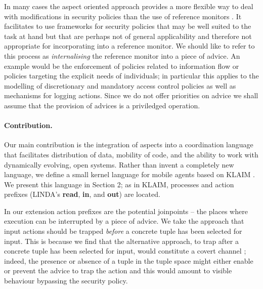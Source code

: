 \documentclass[a4paper]{llncs}
\begin{document}
In many cases the aspect oriented approach provides a more flexible
way to deal with modifications in security policies
\cite{Daniel07,gao2004aao,georg2002uad,verhanneman2005ual,dewin2004dsa}
than the use of reference monitors 
\cite{REF-Shneider}. 
It facilitates to use frameworks for security policies that may be well
suited to the task at hand but that are perhaps not of general
applicability and therefore not appropriate for incorporating into a reference monitor.  We should like to refer to
this process as \emph{internalising} the reference monitor into a
piece of advice. An example would be the enforcement of policies
related to information flow or policies targeting the explicit needs
of individuals; in particular this applies to the modelling of
discretionary and mandatory access control policies \cite{Gollmann} as
well as mechanisms for logging actions. Since we do not offer priorities on advice we shall assume that the provision of advices is a priviledged operation. 


\paragraph{Contribution.}

Our main contribution is the integration of aspects into a
coordination language that facilitates distribution of data, mobility
of code, and the ability to work with dynamically evolving, open
systems.  Rather than invent a completely new language, we define a
small kernel language for mobile agents based on KLAIM
\cite{bettini2003kpt,De1998,NicolaFP00}.  We present this language in
Section 2; as in KLAIM, processes and action prefixes (LINDA's
\textbf{read}, \textbf{in}, and \textbf{out}) are located.

In our extension action prefixes are the potential joinpoints -- the
places where execution can be interrupted by a piece of advice. We
take the approach that input actions should be trapped \emph{before} a
concrete tuple has been selected for input. This is because we find
that the alternative approach, to trap after a concrete tuple has been
selected for input, would constitute a covert channel
\cite{gligor1994guc,Gollmann}; indeed, the presence or absence of a
tuple in the tuple space might either enable or prevent the advice to
trap the action and this would amount to visible behaviour bypassing
the security policy.
\end{document}
